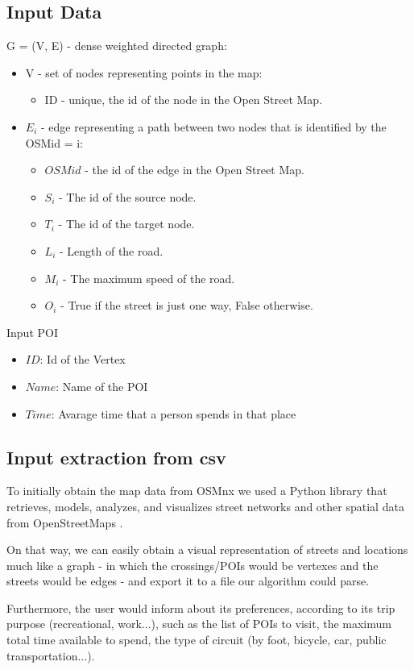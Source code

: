 \documentclass{article}
\begin{document}
\subsection*{Input Data}
G = (V, E) - dense weighted directed graph:
\begin{itemize}
\item V - set of nodes representing points in the map:
    \begin{itemize}
    \item ID - unique, the id of the node in the Open Street Map.
    \end{itemize}

\item $E_i$ - edge representing a path between two nodes that is identified by the OSMid = i:
    \begin{itemize}
    \item $OSM id$ - the id of the edge in the Open Street Map. 
    \item $S_i$ - The id of the source node.
    \item $T_i$ - The id of the target node.
    \item $L_i$ - Length of the road.
    \item $M_i$ - The maximum speed of the road.
    \item $O_i$ - True if the street is just one way, False otherwise.
    \end{itemize}
\end{itemize}

Input POI
\begin{itemize}
    \item $ID$: Id of the Vertex 
    \item $Name$: Name of the POI 
    \item $Time$: Avarage time that a person spends in that place
\end{itemize}

\subsection*{Input extraction from csv}
To initially obtain the map data from OSMnx \cite{OSMnx} we used a Python library that retrieves, models, analyzes, and visualizes street networks and other spatial data from OpenStreetMaps \cite{OpenStreetMaps}. \par
On that way, we can easily obtain a visual representation of streets and locations much like a graph - in which the crossings/POIs would be vertexes and the streets would be edges - and export it to a file our algorithm could parse. \par
Furthermore, the user would inform about its preferences, according to its trip purpose (recreational, work...), such as the list of POIs to visit, the maximum total time available to spend, the type of circuit (by foot, bicycle, car, public transportation...).
\end{document}
